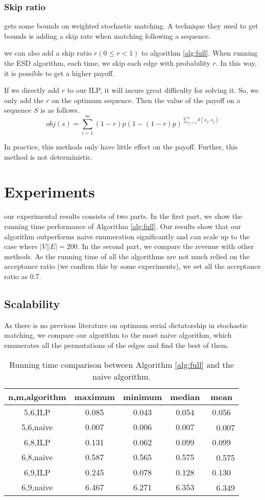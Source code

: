 \documentclass[letterpaper]{article}
\begin{document}
\subsubsection{Skip ratio}
\cite{bansal2012lp} gets some bounds on weighted stochastic matching.
A technique they used to get bounds is adding a skip rate when matching following a sequence.

we can also add a skip ratio $r (0\leq r<1)$ to algorithm \ref{alg:full}.
When running the ESD algorithm, each time, we skip each edge with probability $r$.
In this way, it is possible to get a higher payoff.

If we directly add $r$ to our ILP, it will incurs great difficulty for solving it.
So, we only add the $r$ on the optimum sequence.
Then the value of the payoff on a sequence $S$ is as follows.
\begin{equation}
obj(s)=\sum_{i=1}^{m}(1-r)p(1-(1-r)p)^{\sum_{j=1}^{i}\delta(s_j,s_j)}
\end{equation} 

In practice, this methods only have little effect on the payoff.
Further, this method is not deterministic.

\section{Experiments}

our experimental results consists of two parts.
In the first part, we show the running time performance of Algorithm \ref{alg:full}.
Our results show that our algorithm outperforms naive enumeration significantly and can scale up to the case where $|V||E|=200$.
In the second part, we compare the revenue with other methods.
As the running time of all the algorithms are not much relied on the acceptance ratio (we confirm this by some experiments), we set all the acceptance ratio as 0.7.

\subsection{Scalability}

As there is no previous literature on optimum serial dictatorship in stochastic matching, we compare our algorithm to the most naive algorithm, which enumerates all the permutations of the edges and find the best of them.
\begin{table}
	\caption{Running time comparison between Algorithm \ref{alg:full} and the naive algorithm.}
	\label{tab1}
	\begin{tabular}{ccccc}
		\hline
		n,m,algorithm & maximum & minimum & median & mean\\ \hline
		5,6,ILP & 0.085& 0.043& 0.054& 0.056\\
		5,6,naive & 0.007& 0.006& 0.007&　0.007\\
		6,8,ILP & 0.131& 0.062& 0.099& 0.099\\
		6,8,naive & 0.587& 0.565& 0.575&　0.575\\
		6,9,ILP & 0.245& 0.078& 0.128& 0.130\\
		6,9,naive & 6.467& 6.271& 6.353&　6.349\\ \hline
	\end{tabular}
\end{table}
\end{document}
